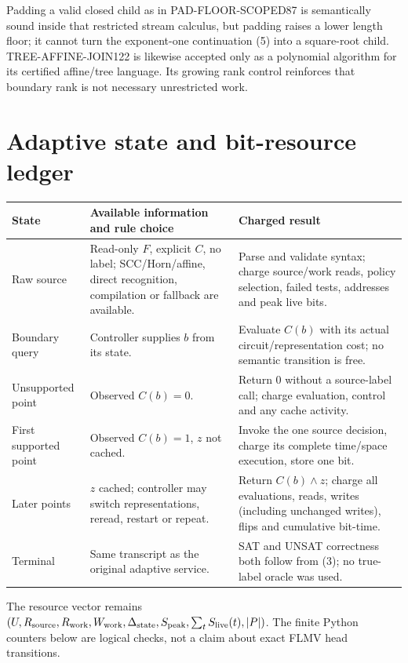 \documentclass[11pt]{article}
\begin{document}
Padding a valid closed child as in PAD-FLOOR-SCOPED87 is semantically sound
inside that restricted stream calculus, but padding raises a lower length
floor; it cannot turn the exponent-one continuation (5) into a square-root
child.  TREE-AFFINE-JOIN122 is likewise accepted only as a polynomial
algorithm for its certified affine/tree language.  Its growing rank control
reinforces that boundary rank is not necessary unrestricted work.

\section{Adaptive state and bit-resource ledger}
\begin{center}\small
\begin{tabularx}{\linewidth}{p{.13\linewidth}X X}
\toprule
State & Available information and rule choice & Charged result \\\midrule
Raw source & Read-only $F$, explicit $C$, no label; SCC/Horn/affine,
direct recognition, compilation or fallback are available. & Parse and
validate syntax; charge source/work reads, policy selection, failed tests,
addresses and peak live bits. \\
Boundary query & Controller supplies $b$ from its state. & Evaluate $C(b)$
with its actual circuit/representation cost; no semantic transition is free. \\
Unsupported point & Observed $C(b)=0$. & Return $0$ without a source-label
call; charge evaluation, control and any cache activity. \\
First supported point & Observed $C(b)=1$, $z$ not cached. & Invoke the one
source decision, charge its complete time/space execution, store one bit. \\
Later points & $z$ cached; controller may switch representations, reread,
restart or repeat. & Return $C(b)\wedge z$; charge all evaluations, reads,
writes (including unchanged writes), flips and cumulative bit-time. \\
Terminal & Same transcript as the original adaptive service. & SAT and
UNSAT correctness both follow from (3); no true-label oracle was used. \\
\bottomrule
\end{tabularx}
\end{center}
The resource vector remains
$(U,R_{\rm source},R_{\rm work},W_{\rm work},\Delta_{\rm state},
S_{\rm peak},\sum_t S_{\rm live}(t),|P|)$.  The finite Python counters below
are logical checks, not a claim about exact FLMV head transitions.
\end{document}

